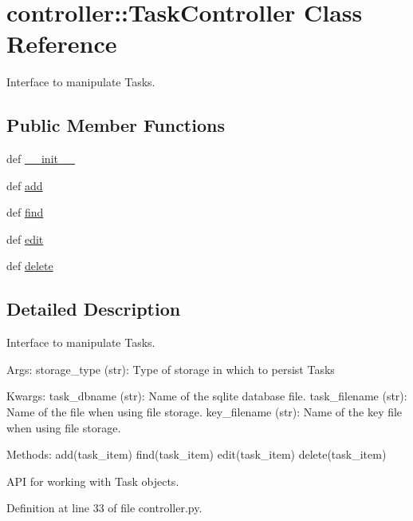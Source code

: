 \hypertarget{classcontroller_1_1TaskController}{
\section{controller\-:\-:\-Task\-Controller \-Class \-Reference}
\label{classcontroller_1_1TaskController}
}


\-Interface to manipulate \-Tasks.  


\subsection*{\-Public \-Member \-Functions}
\begin{DoxyCompactItemize}
\item 
def \hyperlink{classcontroller_1_1TaskController_a68b66bbbc5aff5b7f8a9545468e50f37}{\-\_\-\-\_\-init\-\_\-\-\_\-}
\item 
def \hyperlink{classcontroller_1_1TaskController_a8f07cd6b5b484122fe44db6b1b72ff6a}{add}
\item 
def \hyperlink{classcontroller_1_1TaskController_a2367f97a481f877a8f894447f63f153c}{find}
\item 
def \hyperlink{classcontroller_1_1TaskController_a23267d2ec423afc8fa23db58709333c7}{edit}
\item 
def \hyperlink{classcontroller_1_1TaskController_aa9534d8adaa1b37a76849ee68620de67}{delete}
\end{DoxyCompactItemize}


\subsection{\-Detailed \-Description}
\-Interface to manipulate \-Tasks. 

\-Args\-: storage\-\_\-type (str)\-: \-Type of storage in which to persist \-Tasks

\-Kwargs\-: task\-\_\-dbname (str)\-: \-Name of the sqlite database file. task\-\_\-filename (str)\-: \-Name of the file when using file storage. key\-\_\-filename (str)\-: \-Name of the key file when using file storage.

\-Methods\-: add(task\-\_\-item) find(task\-\_\-item) edit(task\-\_\-item) delete(task\-\_\-item)

\-A\-P\-I for working with \-Task objects. 

\-Definition at line 33 of file controller.\-py.



